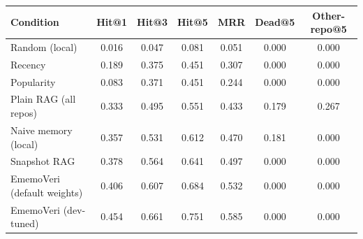 \begin{tabular}{lcccccc}
\toprule
Condition & Hit@1 & Hit@3 & Hit@5 & MRR & Dead@5 & Other-repo@5 \\
\midrule
Random (local) & 0.016 & 0.047 & 0.081 & 0.051 & 0.000 & 0.000 \\
Recency & 0.189 & 0.375 & 0.451 & 0.307 & 0.000 & 0.000 \\
Popularity & 0.083 & 0.371 & 0.451 & 0.244 & 0.000 & 0.000 \\
\midrule
Plain RAG (all repos) & 0.333 & 0.495 & 0.551 & 0.433 & 0.179 & 0.267 \\
Naive memory (local) & 0.357 & 0.531 & 0.612 & 0.470 & 0.181 & 0.000 \\
\midrule
Snapshot RAG & 0.378 & 0.564 & 0.641 & 0.497 & 0.000 & 0.000 \\
\midrule
EmemoVeri (default weights) & 0.406 & 0.607 & 0.684 & 0.532 & 0.000 & 0.000 \\
EmemoVeri (dev-tuned) & 0.454 & 0.661 & 0.751 & 0.585 & 0.000 & 0.000 \\
\bottomrule
\end{tabular}